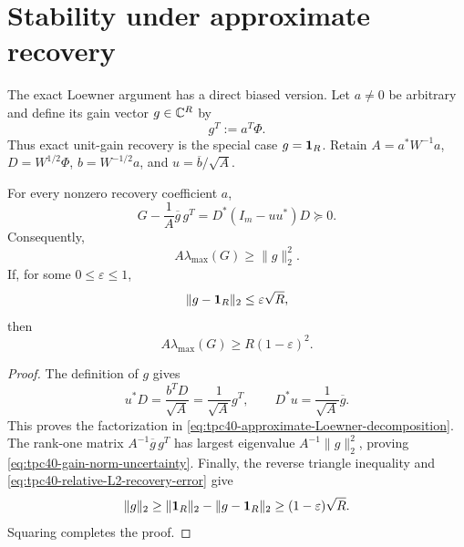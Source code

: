 \section{Stability under approximate recovery}
\label{sec:tpc40-approximate-recovery}

The exact Loewner argument has a direct biased version.  Let \(a\ne0\) be
arbitrary and define its gain vector \(g\in\mathbb C^R\) by
\begin{equation}
 g^T:=a^T\Phi.
 \label{eq:tpc40-approximate-gain}
\end{equation}
Thus exact unit-gain recovery is the special case \(g=\mathbf 1_R\).  Retain
\(A=a^*W^{-1}a\), \(D=W^{1/2}\Phi\), \(b=W^{-1/2}a\), and
\(u=\overline b/\sqrt A\).

\begin{theorem}
\label{thm:tpc40-approximate-Loewner}
For every nonzero recovery coefficient \(a\),
\begin{equation}
 \boxed{
 G-\frac1A\overline g\,g^T
 =D^*(I_m-uu^*)D\succeq0.}
 \label{eq:tpc40-approximate-Loewner-decomposition}
\end{equation}
Consequently,
\begin{equation}
 A\lambda_{\max}(G)\ge\|g\|_2^2.
 \label{eq:tpc40-gain-norm-uncertainty}
\end{equation}
If, for some \(0\le\varepsilon\le1\),
\begin{equation}
 \|g-\mathbf 1_R\|_2\le\varepsilon\sqrt R,
 \label{eq:tpc40-relative-L2-recovery-error}
\end{equation}
then
\begin{equation}
 \boxed{
 A\lambda_{\max}(G)
 \ge R(1-\varepsilon)^2.}
 \label{eq:tpc40-approximate-uncertainty-product}
\end{equation}
\end{theorem}

\begin{proof}
The definition of \(g\) gives
\[
 u^*D=\frac{b^TD}{\sqrt A}=\frac1{\sqrt A}g^T,
 \qquad
 D^*u=\frac1{\sqrt A}\overline g.
\]
This proves the factorization in
\eqref{eq:tpc40-approximate-Loewner-decomposition}.  The rank-one matrix
\(A^{-1}\overline g\,g^T\) has largest eigenvalue
\(A^{-1}\|g\|_2^2\), proving
\eqref{eq:tpc40-gain-norm-uncertainty}.  Finally, the reverse triangle
inequality and \eqref{eq:tpc40-relative-L2-recovery-error} give
\[
 \|g\|_2
 \ge\|\mathbf 1_R\|_2-\|g-\mathbf 1_R\|_2
 \ge(1-\varepsilon)\sqrt R.
\]
Squaring completes the proof.
\end{proof}

